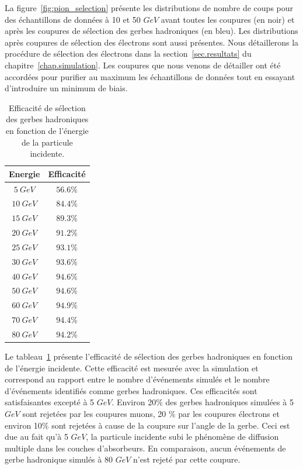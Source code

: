La figure~\ref{fig:pion_selection} présente les distributions de nombre de coups pour des échantillons de données à 10 et 50 $GeV$ avant toutes les coupures (en noir) et après les coupures de sélection des gerbes hadroniques (en bleu). Les distributions après coupures de sélection des électrons sont aussi présentes. Nous détaillerons la procédure de sélection des électrons dans la section~\ref{sec.resultats} du chapitre~\ref{chap.simulation}. Les coupures que nous venons de détailler ont été accordées pour purifier au maximum les échantillons de données tout en essayant d'introduire un minimum de biais.
\begin{table}[!ht]
  \begin{center}
    \begin{tabular}{c|c}
      Energie & Efficacité \\
      \hline
      $5 ~GeV$ & $56.6\%$  \\
      $10~GeV$ & $84.4\%$ \\
      $15~GeV$ & $89.3\%$ \\
      $20~GeV$ & $91.2\%$ \\
      $25~GeV$ & $93.1\%$ \\
      $30~GeV$ & $93.6\%$ \\
      $40~GeV$ & $94.6\%$ \\
      $50~GeV$ & $94.6\%$ \\
      $60~GeV$ & $94.9\%$ \\
      $70~GeV$ & $94.4\%$ \\
      $80~GeV$ & $94.2\%$ \\
    \end{tabular}
  \end{center}  
  \caption{Efficacité de sélection des gerbes hadroniques en fonction de l'énergie de la particule incidente.}
  \label{tab.pi-selection}
\end{table}
Le tableau~\ref{tab.pi-selection} présente l'efficacité de sélection des gerbes hadroniques en fonction de l'énergie incidente. Cette efficacité est mesurée avec la simulation et correspond au rapport entre le nombre d'événements simulés et le nombre d'événements identifiés comme gerbes hadroniques. Ces efficacités sont satisfaisantes excepté à 5 $GeV$. Environ 20$\%$ des gerbes hadroniques simulées à 5 $GeV$ sont rejetées par les coupures muons, 20 $\%$ par les coupures électrons et environ 10$\%$ sont rejetées à cause de la coupure sur l'angle de la gerbe. Ceci est due au fait qu'à 5 $GeV$, la particule incidente subi le phénomène de diffusion multiple dans les couches d'absorbeurs. En comparaison, aucun événements de gerbe hadronique simulés à 80 $GeV$ n'est rejeté par cette coupure.
